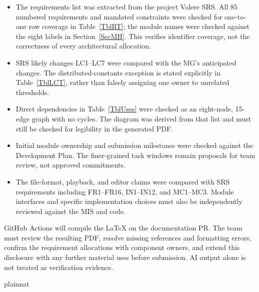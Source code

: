 \documentclass[12pt, titlepage]{article}
\begin{document}
\begin{itemize}
\item The requirements list was extracted from the project Volere SRS.
      All 85 numbered requirements and mandated constraints were
      checked for one-to-one row coverage in Table~\ref{TblRT}; the
      module names were checked against the eight labels in
      Section~\ref{SecMH}. This verifies identifier coverage, not
      the correctness of every architectural allocation.
\item SRS likely changes LC1--LC7 were compared with the MG's
      anticipated changes. The distributed-constants exception is
      stated explicitly in Table~\ref{TblLCT}, rather than falsely
      assigning one owner to unrelated thresholds.
\item Direct dependencies in Table~\ref{TblUses} were checked as an
      eight-node, 15-edge graph with no cycles. The diagram was
      derived from that list and must still be checked for legibility
      in the generated PDF.
\item Initial module ownership and submission milestones were checked
      against the Development Plan. The finer-grained task windows
      remain proposals for team review, not approved commitments.
\item The file-format, playback, and editor claims were compared with
      SRS requirements including FR1--FR16, IN1--IN12, and MC1--MC3.
      Module interfaces and specific implementation choices must
      also be independently reviewed against the MIS and code.
\end{itemize}

GitHub Actions will compile the LaTeX on the documentation PR.
The team must review the resulting PDF, resolve missing references
and formatting errors, confirm the requirement allocations with
component owners, and extend this disclosure with any further
material uses before submission. AI output alone is not treated
as verification evidence.

\newpage{}

 {plainnat}

\end{document}
